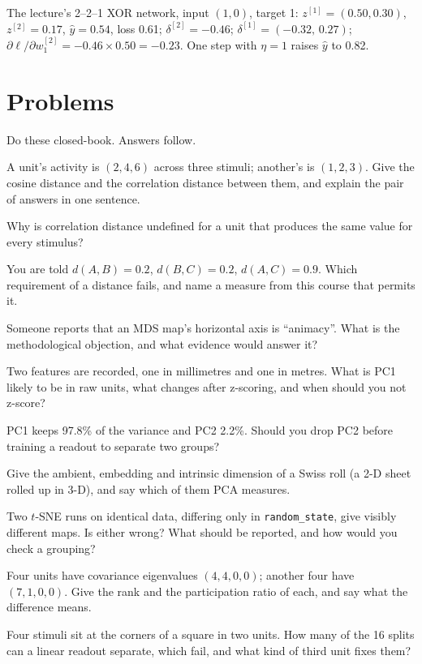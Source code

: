 \documentclass[11pt]{article}
\begin{document}
The lecture's 2--2--1 XOR network, input $(1,0)$, target 1: $z^{[1]}=(0.50,0.30)$,
$z^{[2]}=0.17$, $\hat y=0.54$, loss 0.61; $\delta^{[2]}=-0.46$;
$\delta^{[1]}=(-0.32,\,0.27)$; $\partial\ell/\partial w^{[2]}_1=-0.46\times0.50=-0.23$.
One step with $\eta=1$ raises $\hat y$ to 0.82.

\section{Problems}

Do these closed-book. Answers follow.

 A unit's activity is $(2, 4, 6)$ across three stimuli; another's is
$(1, 2, 3)$. Give the cosine distance and the correlation distance between them,
and explain the pair of answers in one sentence.

 Why is correlation distance undefined for a unit that produces the same
value for every stimulus?

 You are told $d(A,B) = 0.2$, $d(B,C) = 0.2$, $d(A,C) = 0.9$. Which
requirement of a distance fails, and name a measure from this course that
permits it.

 Someone reports that an MDS map's horizontal axis is ``animacy''. What
is the methodological objection, and what evidence would answer it?

 Two features are recorded, one in millimetres and one in metres. What
is PC1 likely to be in raw units, what changes after z-scoring, and when should
you not z-score?

 PC1 keeps 97.8\% of the variance and PC2 2.2\%. Should you drop PC2
before training a readout to separate two groups?

 Give the ambient, embedding and intrinsic dimension of a Swiss roll
(a 2-D sheet rolled up in 3-D), and say which of them PCA measures.

 Two $t$-SNE runs on identical data, differing only in
\texttt{random\_state}, give visibly different maps. Is either wrong? What
should be reported, and how would you check a grouping?

 Four units have covariance eigenvalues $(4, 4, 0, 0)$; another four have
$(7, 1, 0, 0)$. Give the rank and the participation ratio of each, and say what
the difference means.

 Four stimuli sit at the corners of a square in two units. How many of
the 16 splits can a linear readout separate, which fail, and what kind of third
unit fixes them?
\end{document}
